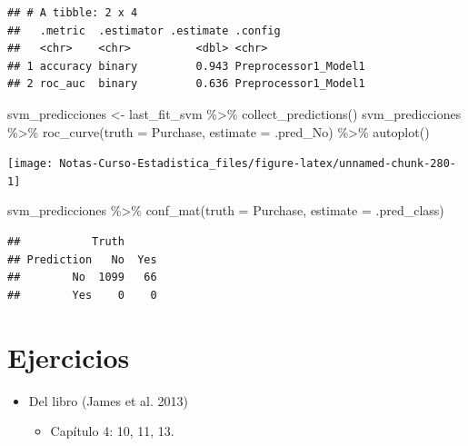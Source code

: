 \documentclass[
  12pt,
]{book}
\newenvironment{Shaded}{\begin{snugshade}}{\end{snugshade}}
\newcommand{\AttributeTok}[1]{\textcolor[rgb]{0.77,0.63,0.00}{#1}}
\newcommand{\FunctionTok}[1]{\textcolor[rgb]{0.00,0.00,0.00}{#1}}
\newcommand{\NormalTok}[1]{#1}
\newcommand{\OtherTok}[1]{\textcolor[rgb]{0.56,0.35,0.01}{#1}}
\newcommand{\SpecialCharTok}[1]{\textcolor[rgb]{0.00,0.00,0.00}{#1}}
\providecommand{\tightlist}{%
  \setlength{\itemsep}{0pt}\setlength{\parskip}{0pt}}
\begin{document}
\begin{verbatim}
## # A tibble: 2 x 4
##   .metric  .estimator .estimate .config             
##   <chr>    <chr>          <dbl> <chr>               
## 1 accuracy binary         0.943 Preprocessor1_Model1
## 2 roc_auc  binary         0.636 Preprocessor1_Model1
\end{verbatim}

\begin{Shaded}
\begin{Highlighting}[]
\NormalTok{svm\_predicciones }\OtherTok{\textless{}{-}}\NormalTok{ last\_fit\_svm }\SpecialCharTok{\%\textgreater{}\%}
    \FunctionTok{collect\_predictions}\NormalTok{()}
\NormalTok{svm\_predicciones }\SpecialCharTok{\%\textgreater{}\%}
    \FunctionTok{roc\_curve}\NormalTok{(}\AttributeTok{truth =}\NormalTok{ Purchase, }\AttributeTok{estimate =}\NormalTok{ .pred\_No) }\SpecialCharTok{\%\textgreater{}\%}
    \FunctionTok{autoplot}\NormalTok{()}
\end{Highlighting}
\end{Shaded}

\begin{center}\texttt{[image: Notas-Curso-Estadistica\_files/figure-latex/unnamed-chunk-280-1]} \end{center}

\begin{Shaded}
\begin{Highlighting}[]
\NormalTok{svm\_predicciones }\SpecialCharTok{\%\textgreater{}\%}
    \FunctionTok{conf\_mat}\NormalTok{(}\AttributeTok{truth =}\NormalTok{ Purchase, }\AttributeTok{estimate =}\NormalTok{ .pred\_class)}
\end{Highlighting}
\end{Shaded}

\begin{verbatim}
##           Truth
## Prediction   No  Yes
##        No  1099   66
##        Yes    0    0
\end{verbatim}

\hypertarget{ejercicios-5}{%
\section{Ejercicios}\label{ejercicios-5}}

\begin{itemize}
\tightlist
\item
  Del libro (James et al. 2013)

  \begin{itemize}
  \tightlist
  \item
    Capítulo 4: 10, 11, 13.
  \end{itemize}
\end{itemize}
\end{document}
